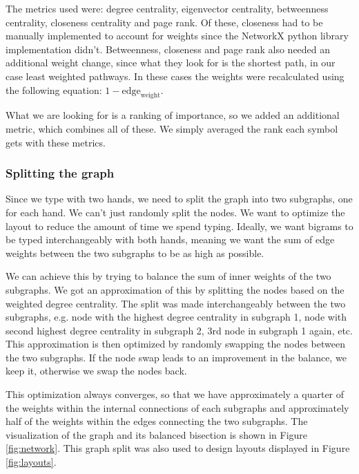 \documentclass[9pt,twocolumn,twoside]{pnas-report}
\begin{document}
{The metrics used were: degree centrality, eigenvector centrality, betweenness centrality, closeness centrality and page rank.
Of these, closeness had to be manually implemented to account for weights since the NetworkX python library implementation didn't.
Betweenness, closeness and page rank also needed an additional weight change, since what they look for is the shortest path, in our case least weighted pathways.
In these cases the weights were recalculated using the following equation: $1 - \text{edge}_\text{weight}$.

What we are looking for is a ranking of importance, so we added an additional metric, which combines all of these.
We simply averaged the rank each symbol gets with these metrics.

\subsubsection*{Splitting the graph}

Since we type with two hands, we need to split the graph into two subgraphs, one for each hand.
We can't just randomly split the nodes.
We want to optimize the layout to reduce the amount of time we spend typing.
Ideally, we want bigrams to be typed interchangeably with both hands, meaning we want the sum of edge weights between the two subgraphs to be as high as possible.

We can achieve this by trying to balance the sum of inner weights of the two subgraphs.
We got an approximation of this by splitting the nodes based on the weighted degree centrality.
The split was made interchangeably between the two subgraphs, e.g. node with the highest degree centrality in subgraph 1, node with second highest degree centrality in subgraph 2, 3rd node in subgraph 1 again, etc.
This approximation is then optimized by randomly swapping the nodes between the two subgraphs.
If the node swap leads to an improvement in the balance, we keep it, otherwise we swap the nodes back.

This optimization always converges, so that we have approximately a quarter of the weights within the internal connections of each subgraphs and approximately half of the weights within the edges connecting the two subgraphs.
The visualization of the graph and its balanced bisection is shown in Figure \ref{fig:network}.
This graph split was also used to design layouts displayed in Figure \ref{fig:layouts}.

}
\end{document}
